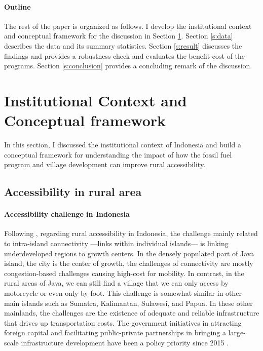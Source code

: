 \documentclass[letterpaper,12pt,leqno]{article}
\begin{document}
\paragraph{Outline} The rest of the paper is organized as follows. I develop the institutional context and conceptual framework for the discussion in Section \ref{s:framework}. Section \ref{s:data} describes the data and its summary statistics. Section \ref{s:result} discusses the findings and provides a robustness check and evaluates the benefit-cost of the programs. Section \ref{s:conclusion} provides a concluding remark of the discussion.

\section{Institutional Context and Conceptual framework}\label{s:framework}

In this section, I discussed the institutional context of Indonesia and build a conceptual framework for understanding the impact of how the fossil fuel program and village development can improve rural accessibility.

\subsection{Accessibility in rural area}

\paragraph{Accessibility challenge in Indonesia}
Following \citet{sandee_2016}, regarding rural accessibility in Indonesia, the challenge mainly related to intra-island connectivity ---links within individual islands--- is linking underdeveloped regions to growth centers. In the densely populated part of Java island, the city is the center of growth, the challenges of connectivity are mostly congestion-based challenges causing high-cost for mobility. In contrast, in the rural areas of Java, we can still find a village that we can only access by motorcycle or even only by foot. This challenge is somewhat similar in other main islands such as Sumatra, Kalimantan, Sulawesi, and Papua. In these other mainlands, the challenges are the existence of adequate and reliable infrastructure that drives up transportation costs. The government initiatives in attracting foreign capital and facilitating public-private partnerships in bringing a large-scale infrastructure development have been a policy priority since 2015 \citep{pwc_2016}.
\end{document}
